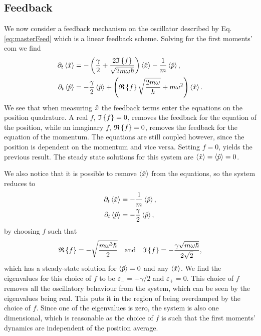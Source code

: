\subsection{Feedback}
We now consider a feedback mechanism on the oscillator described by Eq. \eqref{eq:masterFeed} which is a linear feedback scheme. Solving for the first moments' \gls{eom} we find 
\begin{align}
    \partial_t\expval{\hat{x}} &= - \left(\frac{\gamma}{2} + \frac{2 \mathfrak{I}\left\{f\right\}}{\sqrt{2 m \omega \hbar}} \right)\expval{\hat{x}} - \frac{1}{m} \expval{\hat{p}},\\
    \partial_t\expval{\hat{p}} &= -\frac{\gamma}{2}\expval{\hat{p}} + \left(\mathfrak{R}\left\{f\right\} \sqrt{\frac{2 m \omega}{\hbar}} + m \omega^2 \right) \expval{\hat{x}}.
\end{align}
We see that when measuring $\hat{x}$ the feedback terms enter the equations on the position quadrature. A real $f$, $\mathfrak{I}\left\{f\right\} = 0$, removes the feedback for the equation of the position, while an imaginary $f$, $\mathfrak{R}\left\{f\right\} = 0$, removes the feedback for the equation of the momentum. The equations are still coupled however, since the position is dependent on the momentum and vice versa. Setting $f = 0$, yields the previous result. The steady state solutions for this system are $\expval{\hat{x}} = \expval{\hat{p}} = 0$.

We also notice that it is possible to remove $\expval{\hat{x}}$ from the equations, so the system reduces to 
\begin{align}
    \partial_t\expval{\hat{x}} &= - \frac{1}{m} \expval{\hat{p}},\\
    \partial_t\expval{\hat{p}} &= -\frac{\gamma}{2} \expval{\hat{p}},
\end{align}
by choosing $f$ such that
\begin{equation}
    \mathfrak{R}\left\{f\right\} = - \sqrt{\frac{m \omega^3 \hbar}{2}} \quad \text{and} \quad \mathfrak{I}\left\{f\right\} = -\frac{\gamma\sqrt{m\omega\hbar}}{2\sqrt{2}} \label{eq:reFimF_toZero},
\end{equation}
which has a steady-state solution for $\expval{\hat{p}} = 0$ and any $\expval{\hat{x}}$. We find the eigenvalues for this choice of $f$ to be $\varepsilon_- = -\gamma /2$ and $\varepsilon_+ = 0$. This choice of $f$ removes all the oscillatory behaviour from the system, which can be seen by the eigenvalues being real. This puts it in the region of being overdamped by the choice of $f$. Since one of the eigenvalues is zero, the system is also one dimensional, which is reasonable as the choice of $f$ is such that the first moments' dynamics are independent of the position average.

